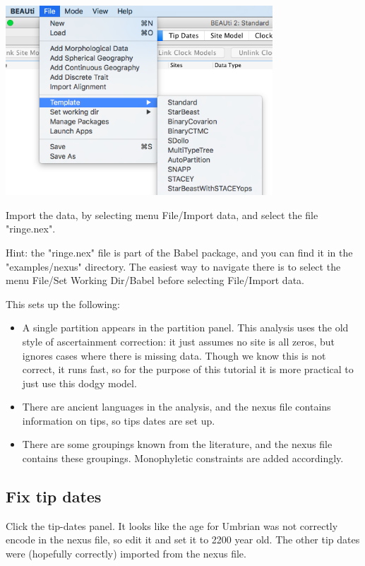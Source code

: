 \documentclass{article}
\begin{document}
\begin{center}
\includegraphics[width=0.75\textwidth]{templates.png}
\end{center}

Import the data, by selecting menu File/Import data, and select the file "ringe.nex".  

Hint: the "ringe.nex" file is part of the Babel package, and you can find it in the "examples/nexus" directory. The easiest way to navigate there is to select the menu File/Set Working Dir/Babel before selecting File/Import data.

This sets up the following:
\begin{itemize}
\item A single partition appears in the partition panel. This analysis uses the old style of ascertainment correction: it just assumes no site is all zeros, but ignores cases where there is missing data. Though we know this is not correct, it runs fast, so for the purpose of this tutorial it is more practical to just use this dodgy model.
\item There are ancient languages in the analysis, and the nexus file contains information on tips, so tips dates are set up.
\item There are some groupings known from the literature, and the nexus file contains these groupings. Monophyletic constraints are added accordingly.
\end{itemize}

\subsection*{Fix tip dates}

Click the tip-dates panel. It looks like the age for Umbrian was not correctly encode in the nexus file, so edit it and set it to 2200 year old. The other tip dates were (hopefully correctly) imported from the nexus file.
\end{document}
